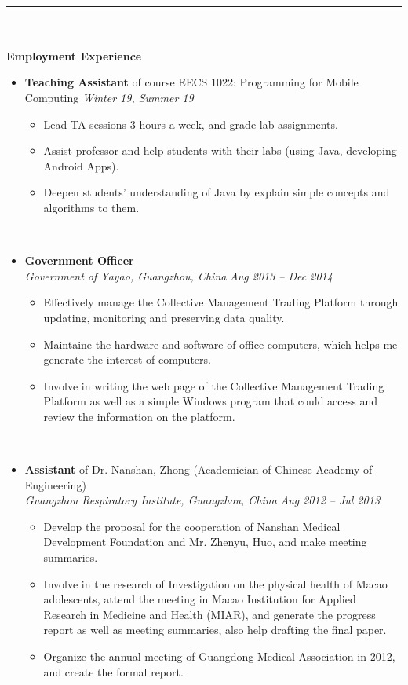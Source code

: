 \documentclass[a4paper,10pt,titlepage]{article}
\begin{document}
~\\
\rule{\linewidth}{0.1mm}
~\\
\\
\textbf {\Large Employment Experience}
\begin{itemize}%
	\item {\bf Teaching Assistant} of course EECS 1022: Programming for Mobile Computing {\hfill \emph {Winter 19, Summer 19}}
	\begin{itemize}%
		\item Lead TA sessions 3 hours a week, and grade lab assignments.
		\item Assist professor and help students with their labs (using Java, developing Android Apps).
		\item Deepen students' understanding of Java by explain simple concepts and algorithms to them.
	\end{itemize}
	~\\
	\item {\bf Government Officer}
	\\\emph {Government of Yayao, Guangzhou, China} {\hfill \emph{Aug 2013 – Dec 2014}}
	\begin{itemize}%
	\item Effectively manage the Collective Management Trading Platform through updating, monitoring and preserving data quality.
	\item Maintaine the hardware and software of office computers, which helps me generate the interest of computers.
	\item Involve in writing the web page of the Collective Management Trading Platform as well as a simple Windows program that could access and review the information on the platform.
	\end{itemize}
	~\\
	\item {\bf Assistant} of Dr. Nanshan, Zhong (Academician of Chinese	Academy of Engineering)
	\\\emph {Guangzhou Respiratory Institute, Guangzhou, China} {\hfill \emph{Aug 2012 – Jul 2013}}
	\begin{itemize}%
	\item Develop the proposal for the cooperation of Nanshan Medical Development Foundation and Mr. Zhenyu, Huo, and make meeting summaries.
	\item Involve in the research of Investigation on the physical health of Macao adolescents, attend the meeting in Macao Institution for Applied Research in Medicine and Health (MIAR), and generate the progress report as well as meeting summaries, also help drafting the final paper.
	\item Organize the annual meeting of Guangdong Medical Association in 2012, and create the  formal report.
	\end{itemize}
\end{itemize}
\end{document}
